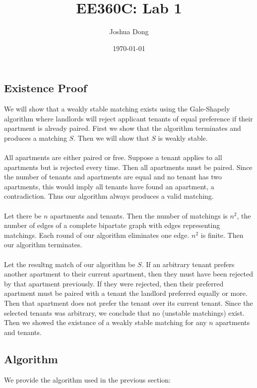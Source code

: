 \documentclass{article}
\begin{document}
\title{EE360C: Lab 1}
\author{Joshua Dong}
\date{\today}
\maketitle

\subsection{Existence Proof}
We will show that a weakly stable matching exists using the Gale-Shapely
algorithm where landlords will reject applicant tenants of equal preference if
their apartment is already paired. First we show that the algorithm terminates
and produces a matching $S$. Then we will show that $S$ is weakly stable.
\\\\
All apartments are either paired or free. Suppose a tenant applies to all
apartments but is rejected every time. Then all apartments must be paired.
Since the number of tenants and apartments are equal and no tenant has
two apartments, this would imply all tenants have found an apartment,
a contradiction. Thus our algorithm always produces a valid matching.
\\\\
Let there be $n$ apartments and tenants. Then the number of matchings is
$n^2$, the number of edges of a complete bipartate graph with edges
representing matchings. Each round of our algorithm eliminates one edge.
$n^2$ is finite. Then our algorithm terminates.
\\\\
Let the resultng match of our algorithm be $S$. If an arbitrary tenant prefers
another apartment to their current apartment, then they must have been
rejected by that apartment previously. If they were rejected, then their
preferred apartment must be paired with a tenant the landlord preferred
equally or more. Then that apartment does not prefer the tenant over its
current tenant. Since the selected tenants was arbitrary, we conclude that
no (unstable matchings) exist. Then we showed the existance of a weakly stable
matching for any $n$ apartments and tenants.


\newpage
\subsection{Algorithm}
We provide the algorithm used in the previous section:

\begin{algorithmic}
    \Else
        \EndIf
    \EndIf
\EndWhile
\end{algorithmic}
\end{document}
